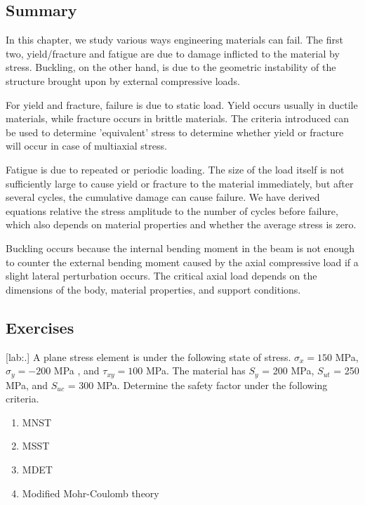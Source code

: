 \documentclass[a4paper,openany,nobib]{tufte-book}
\begin{document}
{{\subsection{Summary}
\label{summary-3}
In this chapter, we study various ways engineering materials can fail.
The first two, yield/fracture and fatigue are due to damage inflicted to
the material by stress. Buckling, on the other hand, is due to the
geometric instability of the structure brought upon by external
compressive loads.

For yield and fracture, failure is due to static load. Yield occurs
usually in ductile materials, while fracture occurs in brittle
materials. The criteria introduced can be used to determine 'equivalent'
stress to determine whether yield or fracture will occur in case of
multiaxial stress.

Fatigue is due to repeated or periodic loading. The size of the load
itself is not sufficiently large to cause yield or fracture to the
material immediately, but after several cycles, the cumulative damage
can cause failure. We have derived equations relative the stress
amplitude to the number of cycles before failure, which also depends on
material properties and whether the average stress is zero.

Buckling occurs because the internal bending moment in the beam is not
enough to counter the external bending moment caused by the axial
compressive load if a slight lateral perturbation occurs. The critical
axial load depends on the dimensions of the body, material properties,
and support conditions.

\subsection{Exercises}
\label{exercises-3}
[lab:.] A plane stress element is
under the following state of stress. \(\sigma_x = 150\) MPa,
\(\sigma_y = -200\) MPa , and \(\tau_{xy} = 100\) MPa. The material has
\(S_y\) = 200 MPa, \(S_{ut}\) = 250 MPa, and \(S_{uc}\) = 300 MPa. Determine
the safety factor under the following criteria.

\begin{enumerate}
\item MNST

\item MSST

\item MDET

\item Modified Mohr-Coulomb theory
\end{enumerate}


}}
\end{document}

